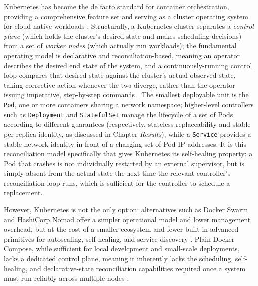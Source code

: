\documentclass[twoside]{supsistudent}
\begin{document}
Kubernetes has become the de facto standard for container orchestration, providing a comprehensive feature set and serving as a cluster operating system for cloud-native workloads \cite{truyen2020managing, truyen2019comprehensive}. Structurally, a Kubernetes cluster separates a \emph{control plane} (which holds the cluster's desired state and makes scheduling decisions) from a set of \emph{worker nodes} (which actually run workloads); the fundamental operating model is declarative and reconciliation-based, meaning an operator describes the desired end state of the system, and a continuously-running control loop compares that desired state against the cluster's actual observed state, taking corrective action whenever the two diverge, rather than the operator issuing imperative, step-by-step commands \cite{burns2016borg, verma2015borg, k8s-components}. The smallest deployable unit is the \texttt{Pod}, one or more containers sharing a network namespace; higher-level controllers such as \texttt{Deployment} and \texttt{StatefulSet} manage the lifecycle of a set of Pods according to different guarantees (respectively, stateless replaceability and stable per-replica identity, as discussed in Chapter \emph{Results}), while a \texttt{Service} provides a stable network identity in front of a changing set of Pod IP addresses. It is this reconciliation model specifically that gives Kubernetes its self-healing property: a Pod that crashes is not individually restarted by an external supervisor, but is simply absent from the actual state the next time the relevant controller's reconciliation loop runs, which is sufficient for the controller to schedule a replacement.

However, Kubernetes is not the only option: alternatives such as Docker Swarm and HashiCorp Nomad offer a simpler operational model and lower management overhead, but at the cost of a smaller ecosystem and fewer built-in advanced primitives for autoscaling, self-healing, and service discovery \cite{avireneni2022cloud, truyen2019comprehensive}. Plain Docker Compose, while sufficient for local development and small-scale deployments, lacks a dedicated control plane, meaning it inherently lacks the scheduling, self-healing, and declarative-state reconciliation capabilities required once a system must run reliably across multiple nodes \cite{codingprotocols2026kubernetes, distr2026dockercompose}.
\end{document}
